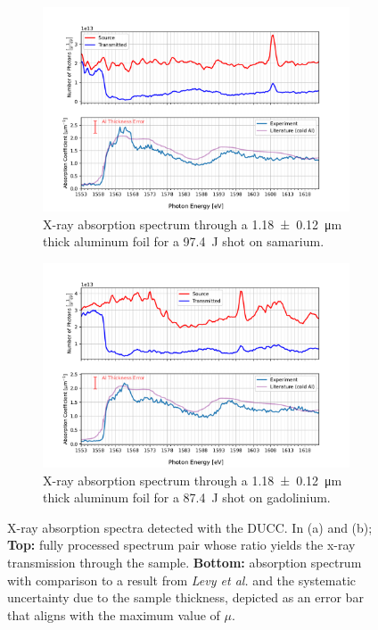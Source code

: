 \begin{figure} [!htbp]
	\centering
	\begin{subfigure}[t]{0.88\textwidth}
		\centering
		\includegraphics[width=\textwidth]{Data_Analysis/absorption_wo_calibration/absorption_spectrum_of_Sm_event_31_on_DUCC.pdf}
		\caption{X-ray absorption spectrum through a \SI{1.18\pm0.12}{\micro\meter} thick aluminum foil for a \SI{97.4}{\joule} shot on samarium.}
		\label{fig: DUCC absorption Sm}
	\end{subfigure}%
	\hfill
	\begin{subfigure}[t]{0.88\textwidth}
		\centering
		\includegraphics[width=\textwidth]{Data_Analysis/absorption_wo_calibration/absorption_spectrum_of_Gd_event_32_on_DUCC.pdf}
		\caption{X-ray absorption spectrum through a \SI{1.18\pm0.12}{\micro\meter} thick aluminum foil for a \SI{87.4}{\joule} shot on gadolinium.}
		\label{fig: DUCC absorption Gd}
	\end{subfigure}
	\caption{X-ray absorption spectra detected with the DUCC. In (a) and (b); \textbf{Top:} fully processed spectrum pair whose ratio yields the x-ray transmission through the sample. \textbf{Bottom:} absorption spectrum with comparison to a result from \textit{Levy et al.} \citep{levy2010double} and the systematic uncertainty due to the sample thickness, depicted as an error bar that aligns with the maximum value of $\mu$.}
	\label{fig: DUCC absorption}
\end{figure}

